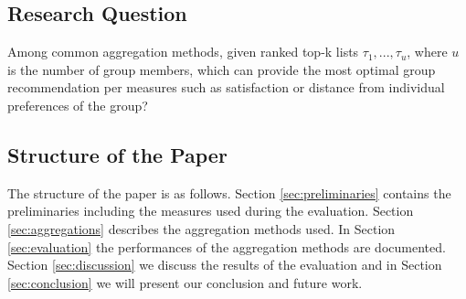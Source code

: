 \subsection{Research Question}

Among common aggregation methods, given ranked top-k lists $\tau_1, ... , \tau_u$, where $u$ is the number of group members, which can provide the most optimal group recommendation per measures such as satisfaction or distance from individual preferences of the group?

\subsection{Structure of the Paper}
The structure of the paper is as follows. Section \ref{sec:preliminaries} contains the preliminaries including the measures used during the evaluation. Section \ref{sec:aggregations} describes the aggregation methods used. In Section \ref{sec:evaluation} the performances of the aggregation methods are documented. Section \ref{sec:discussion} we discuss the results of the evaluation and in Section \ref{sec:conclusion} we will present our conclusion and future work.